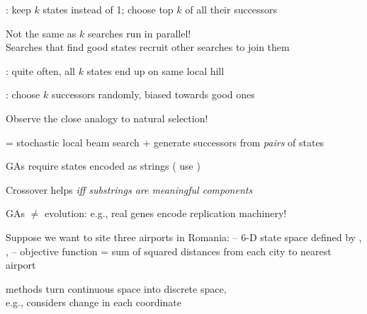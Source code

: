 \documentclass{article}
\begin{document}
\begin{huge}

: keep $k$ states instead of 1; choose top $k$ of all their successors

Not the same as $k$ searches run in parallel!\\
Searches that find good states recruit other searches to join them

: quite often, all $k$ states end up on same local hill

: choose $k$ successors randomly, biased towards good ones

Observe the close analogy to natural selection!


= stochastic local beam search + generate successors from \emph{pairs} of states

\vspace*{0.2in}

\textwidth
{}


GAs require states encoded as strings ( use )

Crossover helps \emph{iff substrings are meaningful components}

\vspace*{0.2in}

\textwidth
{}

GAs $\neq$ evolution: e.g., real genes encode replication machinery!


Suppose we want to site three airports in Romania:\al
-- 6-D state space defined by , , \al
-- objective function  = \nl
   sum of squared distances from each city to nearest airport

 methods turn continuous space into discrete space,\\
e.g.,  considers \mat{$\pm \delta$} change in each coordinate


\end{huge}
\end{document}
